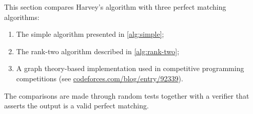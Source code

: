 This section compares Harvey's algorithm with three perfect matching algorithms:
\begin{enumerate}
   \item The simple algorithm presented in \cref{alg:simple};
   \item The rank-two algorithm described in \cref{alg:rank-two};
 \item A graph theory-based implementation used in competitive programming competitions (see \href{https://codeforces.com/blog/entry/92339}{codeforces.com/blog/entry/92339}).
\end{enumerate}
The comparisons are made through random tests together with a verifier that asserts the output is a valid perfect matching.

